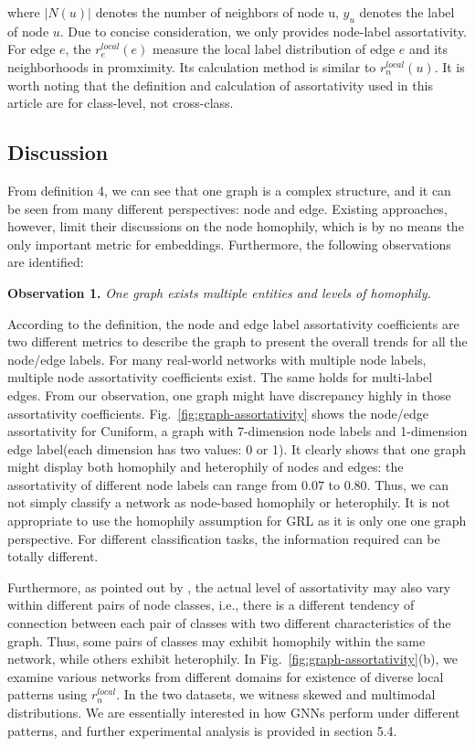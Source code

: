 \documentclass[10pt,journal,compsoc]{IEEEtran}
\begin{document}
where $|N(u)|$ denotes the number of neighbors of node u, $y_u$ denotes the label of node $u$. Due to concise consideration, we only provides node-label assortativity. For edge $e$, the $r_e^{local}(e)$ measure the local label distribution of edge $e$ and its neighborhoods in promximity. Its calculation method is similar to $r_n^{local}(u)$.  It is worth noting that the definition and calculation of assortativity used in this article are for class-level, not cross-class.

\subsection{Discussion}

From definition 4, we can see that one graph is a complex structure, and it can be seen from many different perspectives: node and edge. Existing approaches, however, limit their discussions on the node homophily, which is by no means the only important metric for embeddings. Furthermore, the following observations are identified:

\noindent\textbf{Observation 1.} \textit{One graph exists multiple entities and levels of homophily.}

According to the definition, the node and edge label assortativity coefficients are two different metrics to describe the graph to present the overall trends for all the node/edge labels. For many real-world networks with multiple node labels, multiple node assortativity coefficients exist. The same holds for multi-label edges. From our observation, one graph might have discrepancy highly in those assortativity coefficients. Fig.~\ref{fig:graph-assortativity} shows the node/edge assortativity for Cuniform, a graph with 7-dimension node labels and 1-dimension edge label(each dimension has two values: 0 or 1). It clearly shows that one graph might display both homophily and heterophily of nodes and edges: the assortativity of different node labels can range from $0.07$ to $0.80$. Thus, we can not simply classify a network as node-based homophily or heterophily. It is not appropriate to use the homophily assumption for GRL as it is only one one graph perspective. For different classification tasks, the information required can be totally different.



Furthermore, as pointed out by \cite{Zhu2020}, the actual level of assortativity may also vary within different pairs of node classes, i.e., there is a different tendency of connection between each pair of classes with two different characteristics of the graph. Thus, some pairs of classes may exhibit homophily within the same network, while others exhibit heterophily. In Fig.~\ref{fig:graph-assortativity}(b), we examine various networks from different domains for existence of diverse local patterns using $r_n^{local}$. In the two datasets, we witness skewed and multimodal distributions. We are essentially interested in how GNNs perform under different patterns, and further experimental analysis is provided in section 5.4.
\end{document}
